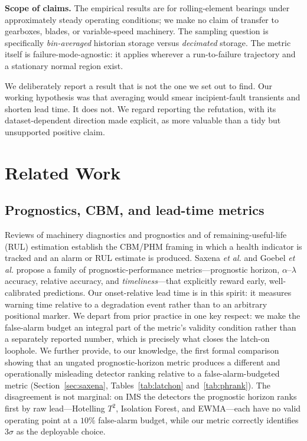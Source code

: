 \documentclass[journal]{IEEEtran}
\begin{document}
\textbf{Scope of claims.} The empirical results are for rolling-element bearings
under approximately steady operating conditions; we make no claim of transfer to
gearboxes, blades, or variable-speed machinery. The sampling question is
specifically \emph{bin-averaged} historian storage versus \emph{decimated}
storage. The metric itself is failure-mode-agnostic: it applies wherever a
run-to-failure trajectory and a stationary normal region exist.

We deliberately report a result that is not the one we set out to find. Our
working hypothesis was that averaging would smear incipient-fault transients
and shorten lead time. It does not. We regard reporting the refutation, with
its dataset-dependent direction made explicit, as more valuable than a tidy but
unsupported positive claim.

\section{Related Work}

\subsection{Prognostics, CBM, and lead-time metrics}
Reviews of machinery diagnostics and prognostics
\cite{jardine2006,lei2018,lee2014} and of remaining-useful-life (RUL)
estimation \cite{si2011} establish the CBM/PHM framing in which a health
indicator is tracked and an alarm or RUL estimate is produced. Saxena
\emph{et al.} \cite{saxena2008,saxena2010} and Goebel \emph{et al.}
\cite{goebel2011} propose a family of prognostic-performance metrics---prognostic
horizon, $\alpha$--$\lambda$ accuracy, relative accuracy, and
\emph{timeliness}---that explicitly reward early, well-calibrated predictions.
Our onset-relative lead time is in this spirit: it measures warning time
relative to a degradation event rather than to an arbitrary positional marker.
We depart from prior practice in one key respect: we make the false-alarm
budget an integral part of the metric's validity condition rather than a
separately reported number, which is precisely what closes the latch-on
loophole. We further provide, to our knowledge, the first formal comparison showing
that an ungated prognostic-horizon metric produces a different and operationally
misleading detector ranking relative to a false-alarm-budgeted metric
(Section~\ref{sec:saxena}, Tables~\ref{tab:latchon} and~\ref{tab:phrank}). The
disagreement is not marginal: on IMS the detectors the prognostic horizon ranks
first by raw lead---Hotelling $T^2$, Isolation Forest, and EWMA---each have no valid
operating point at a $10\%$ false-alarm budget, while our metric correctly
identifies 3$\sigma$ as the deployable choice.
\end{document}
